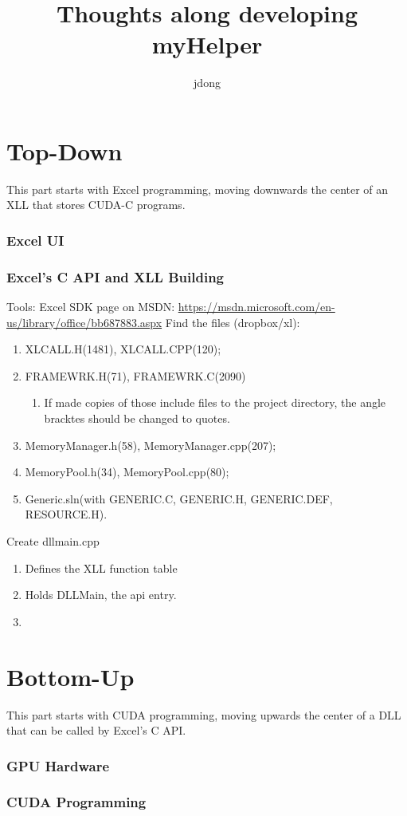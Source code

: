 \documentclass{article}
\title{Thoughts along developing myHelper}
\author{jdong}
\numberwithin{equation}{subsection}
\begin{document}
	\maketitle
	\part{Top-Down}
	This part starts with Excel programming, moving downwards the center of an XLL that stores CUDA-C programs.
	\section{Excel UI}
	\section{Excel's C API and XLL Building}
	Tools: Excel SDK page on MSDN: \url{https://msdn.microsoft.com/en-us/library/office/bb687883.aspx}
	Find the files (dropbox/xl):
	\begin{enumerate}
		\item XLCALL.H(1481), XLCALL.CPP(120);
		\item FRAMEWRK.H(71), FRAMEWRK.C(2090)
		\begin{enumerate}
			\item If made copies of those include files to the project directory, the angle bracktes should be changed to quotes.
		\end{enumerate}
		\item MemoryManager.h(58), MemoryManager.cpp(207);
		\item MemoryPool.h(34), MemoryPool.cpp(80);
		\item Generic.sln(with GENERIC.C, GENERIC.H, GENERIC.DEF, RESOURCE.H).
	\end{enumerate}
	Create dllmain.cpp\begin{enumerate}
		\item Defines the XLL function table \cite{BoveyWallentin2009ProfessionalExcelDevelopment-Th}
		\item Holds DLLMain, the api entry.
		\item 
	\end{enumerate}
	\part{Bottom-Up}
	This part starts with CUDA programming, moving upwards the center of a DLL that can be called by Excel's C API.
	\section{GPU Hardware}
	\section{CUDA Programming}
	
	
	
\end{document}
